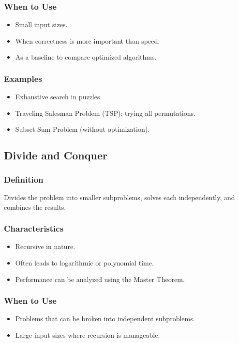 \documentclass[12pt]{article}
\begin{document}
\subsubsection{When to Use}
\begin{itemize}
    \item Small input sizes.
    \item When correctness is more important than speed.
    \item As a baseline to compare optimized algorithms.
\end{itemize}

\subsubsection{Examples}
\begin{itemize}
    \item Exhaustive search in puzzles.
    \item Traveling Salesman Problem (TSP): trying all permutations.
    \item Subset Sum Problem (without optimization).
\end{itemize}

\subsection{Divide and Conquer}

\subsubsection{Definition}
Divides the problem into smaller subproblems, solves each independently, and combines the results.

\subsubsection{Characteristics}
\begin{itemize}
    \item Recursive in nature.
    \item Often leads to logarithmic or polynomial time.
    \item Performance can be analyzed using the Master Theorem.
\end{itemize}

\subsubsection{When to Use}
\begin{itemize}
    \item Problems that can be broken into independent subproblems.
    \item Large input sizes where recursion is manageable.
\end{itemize}
\end{document}
